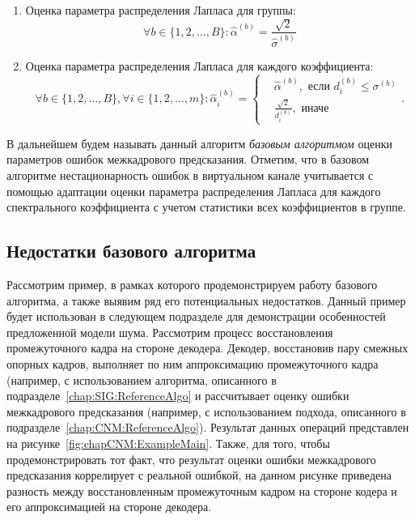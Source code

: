 \begin{enumerate}
  \item Оценка параметра распределения Лапласа для группы:
  \begin{equation*}
  \forall b \in \{1,2,\ldots, B\}: \hat{\alpha}^{(b)} = \frac{\sqrt{2}}{\hat{\sigma}^{(b)}}
  \end{equation*}
  
  \item\label{algo:DiscoverCNM:FinalEstmation} Оценка параметра распределения Лапласа для каждого коэффициента:
  \begin{equation*}
  \forall b \in \{1,2,\ldots, B\}, \forall i \in \{1,2,\ldots, m\}:
  \hat{\alpha}^{(b)}_i = 
  \begin{cases}
  & \hat{\alpha}^{(b)},\text{ если $d^{(b)}_i \leq \sigma^{(b)}$} \\
  & \frac{\sqrt{2}}{d^{(b)}_i},\text{ иначе}
  \end{cases}.
  \end{equation*}

\end{enumerate}

В дальнейшем будем называть данный алгоритм \emph{базовым алгоритмом} оценки параметров ошибок межкадрового предсказания. Отметим, что в базовом алгоритме нестационарность ошибок в виртуальном канале учитывается  с помощью адаптации оценки параметра распределения Лапласа для каждого спектрального коэффициента с учетом статистики всех коэффициентов в группе.

\subsection{Недостатки базового алгоритма}
\label{chap:CNM:ReferenceAlgo:Troubles}

Рассмотрим пример, в рамках которого продемонстрируем работу базового алгоритма, а также выявим ряд его потенциальных недостатков. Данный пример будет использован в следующем подразделе для демонстрации особенностей предложенной модели шума. Рассмотрим процесс восстановления промежуточного кадра на стороне декодера. Декодер, восстановив пару смежных опорных кадров, выполняет по ним аппроксимацию промежуточного кадра (например, с использованием алгоритма, описанного в подразделе~\ref{chap:SIG:ReferenceAlgo} и рассчитывает оценку ошибки межкадрового предсказания (например, с использованием подхода, описанного в подразделе~\ref{chap:CNM:ReferenceAlgo}). Результат данных операций представлен на рисунке~\ref{fig:chapCNM:ExampleMain}. Также, для того, чтобы продемонстрировать тот факт, что результат оценки ошибки межкадрового предсказания коррелирует с реальной ошибкой, на данном рисунке приведена разность между восстановленным промежуточным кадром на стороне кодера и его аппроксимацией на стороне декодера.

